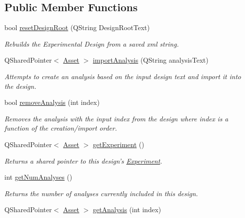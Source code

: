\subsection*{Public Member Functions}
\begin{DoxyCompactItemize}
\item 
bool \hyperlink{class_picto_1_1_design_root_acae1228aa37df9dc66c0a05ddbb9129b}{reset\-Design\-Root} (Q\-String Design\-Root\-Text)
\begin{DoxyCompactList}\small\item\em Rebuilds the Experimental Design from a saved xml string. \end{DoxyCompactList}\item 
Q\-Shared\-Pointer$<$ \hyperlink{class_picto_1_1_asset}{Asset} $>$ \hyperlink{class_picto_1_1_design_root_a8840b2f3c56ba3b6b5bb969b4fce95ff}{import\-Analysis} (Q\-String analysis\-Text)
\begin{DoxyCompactList}\small\item\em Attempts to create an analysis based on the input design text and import it into the design. \end{DoxyCompactList}\item 
bool \hyperlink{class_picto_1_1_design_root_a7049bc66947f5b9f36d7670c470356fb}{remove\-Analysis} (int index)
\begin{DoxyCompactList}\small\item\em Removes the analysis with the input index from the design where index is a function of the creation/import order. \end{DoxyCompactList}\item 
Q\-Shared\-Pointer$<$ \hyperlink{class_picto_1_1_asset}{Asset} $>$ \hyperlink{class_picto_1_1_design_root_a4b69e2bd671f36df8bdd903b664c7471}{get\-Experiment} ()
\begin{DoxyCompactList}\small\item\em Returns a shared pointer to this design's \hyperlink{class_picto_1_1_experiment}{Experiment}. \end{DoxyCompactList}\item 
\hypertarget{class_picto_1_1_design_root_aa3fcc78644b5ab4a53423ec8696af56b}{int \hyperlink{class_picto_1_1_design_root_aa3fcc78644b5ab4a53423ec8696af56b}{get\-Num\-Analyses} ()}\label{class_picto_1_1_design_root_aa3fcc78644b5ab4a53423ec8696af56b}

\begin{DoxyCompactList}\small\item\em Returns the number of analyses currently included in this design. \end{DoxyCompactList}\item 
\hypertarget{class_picto_1_1_design_root_a9a890862b928fa11267489541e381585}{Q\-Shared\-Pointer$<$ \hyperlink{class_picto_1_1_asset}{Asset} $>$ \hyperlink{class_picto_1_1_design_root_a9a890862b928fa11267489541e381585}{get\-Analysis} (int index)}\label{class_picto_1_1_design_root_a9a890862b928fa11267489541e381585}


\end{DoxyCompactItemize}
